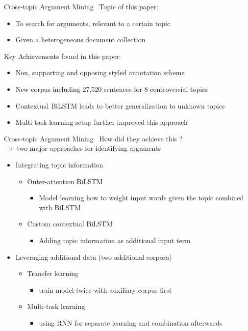 \documentclass[english,handout]{mlutalk}
\begin{document}
\begin{frame}{Cross-topic Argument Mining~\cite{StabMSRG2018}}
  Topic of this paper:
  \begin{itemize}
    \item To search for arguments, relevant to a certain topic 
    \item Given a heterogeneous document collection
  \end{itemize}
  Key Achievements found in this paper:
  \begin{itemize}
    \item Non, supporting and opposing styled annotation scheme
    \item New corpus including 27,520 sentences for 8 controversial topics
    \item Contextual BiLSTM leads to better generalization to unknown topics
    \item Multi-task learning setup further improved this approach 
  \end{itemize}
\end{frame}

\begin{frame}{Cross-topic Argument Mining~\cite{StabMSRG2018}}
  How did they achieve this ?\\
  $\rightarrow$ two major approaches for identifying arguments
  \begin{itemize}
    \item Integrating topic information
    \begin{itemize}
      \item Outer-attention BiLSTM 
      \begin{itemize}
        \item Model learning how to weight input words given the topic combined with BiLSTM
      \end{itemize}
      \item Custom contextual BiLSTM
      \begin{itemize}
        \item Adding topic information as additional input term 
      \end{itemize}
    \end{itemize}
    \item Leveraging additional data (two additional corpora)
    \begin{itemize}
      \item Transfer learning
      \begin{itemize}
        \item train model twice with auxiliary corpus first 
      \end{itemize}
      \item Multi-task learning
      \begin{itemize}
        \item using RNN for separate learning and combination afterwards
      \end{itemize}
    \end{itemize}
  \end{itemize}
\end{frame}
\end{document}
